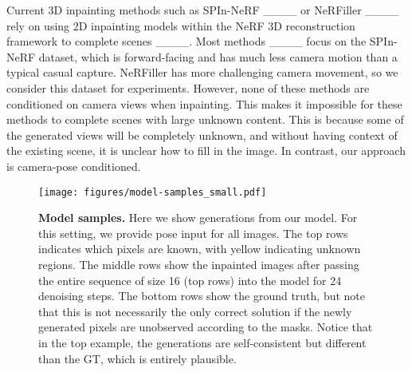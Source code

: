 Current 3D inpainting methods such as SPIn-NeRF ____ or NeRFiller ____ rely on using 2D inpainting models within the NeRF 3D reconstruction framework to complete scenes ____.
Most methods ____ focus on the SPIn-NeRF dataset, which is forward-facing and has much less camera motion than a typical casual capture.
NeRFiller has more challenging camera movement, so we consider this dataset for experiments.
However, none of these methods are conditioned on camera views when inpainting.
This makes it impossible for these methods to complete scenes with large unknown content.
This is because some of the generated views will be completely unknown, and without having context of the existing scene, it is unclear how to fill in the image.
In contrast, our approach is camera-pose conditioned.

\begin{figure*}[t]
\centering
\texttt{[image: figures/model-samples\_small.pdf]}
\vspace{-15px}
\caption{\label{fig:model_samples}%
    \textbf{Model samples.}
    Here we show generations from our model.
    For this setting, we provide pose input for all images.
    The top rows indicates which pixels are known, with yellow indicating unknown regions.
    The middle rows show the inpainted images after passing the entire sequence of size 16 (top rows) into the model for 24 denoising steps.
    The bottom rows show the ground truth, but note that this is not necessarily the only correct solution if the newly generated pixels are unobserved according to the masks.
    Notice that in the top example, the generations are self-consistent but different than the GT, which is entirely plausible.
    \vspace{-1em}
}
\end{figure*}

\vspace{-5px}